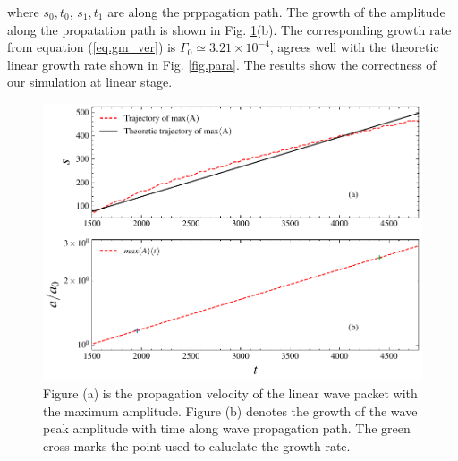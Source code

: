 where $s_0,t_0$, $s_1,t_1$ are along the prppagation path.
The growth of the amplitude along the propatation path is shown in Fig. \ref{fig.linear}(b). The corresponding growth rate from equation (\ref{eq.gm_ver}) is $\Gamma_0 \simeq 3.21\times10^{-4}$, agrees well with the theoretic linear growth rate shown in Fig. \ref{fig.para}.
The results show the correctness of our simulation at linear stage.
\begin{figure}[htbp]
    \centering
    \includegraphics[scale=0.5]{cpc_img/fig_linear.pdf}
    \caption{Figure (a) is the propagation velocity of the linear wave packet with the maximum amplitude. Figure (b) denotes the growth of the wave peak amplitude with time along wave propagation path. The green cross marks the point used to caluclate the growth rate.}
    \label{fig.linear}
\end{figure}

